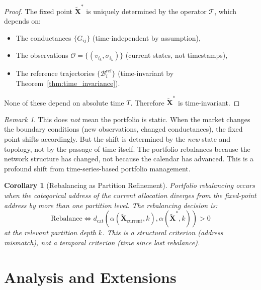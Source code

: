 \documentclass[twocolumn,10pt]{article}
\newtheorem{corollary}[theorem]{Corollary}
\theoremstyle{remark}
\newtheorem{remark}[theorem]{Remark}
\newcommand{\fuzzy}[1]{\tilde{#1}}
\newcommand{\dcat}{d_{\mathrm{cat}}}
\newcommand{\Tcomp}{\mathcal{T}}
\newcommand{\thmref}[1]{Theorem~\ref{#1}}
\begin{document}
\begin{proof}
The fixed point $\fuzzy{\mathbf{X}}^*$ is uniquely determined by the operator $\Tcomp$, which depends on:
\begin{itemize}
    \item The conductances $\{G_{ij}\}$ (time-independent by assumption),
    \item The observations $\mathcal{O} = \{(v_{i_k}, \sigma_{i_k})\}$ (current states, not timestamps),
    \item The reference trajectories $\{\mathcal{B}_i^{\text{ref}}\}$ (time-invariant by \thmref{thm:time_invariance}).
\end{itemize}
None of these depend on absolute time $T$.  Therefore $\fuzzy{\mathbf{X}}^*$ is time-invariant.
\end{proof}

\begin{remark}
This does \emph{not} mean the portfolio is static.  When the market changes the boundary conditions (new observations, changed conductances), the fixed point shifts accordingly.  But the shift is determined by the \emph{new} state and topology, not by the passage of time itself.  The portfolio rebalances because the network structure has changed, not because the calendar has advanced.  This is a profound shift from time-series-based portfolio management.
\end{remark}

\begin{corollary}[Rebalancing as Partition Refinement]
\label{cor:rebalancing}
Portfolio rebalancing occurs when the categorical address of the current allocation diverges from the fixed-point address by more than one partition level.  The rebalancing decision is:
\begin{equation}
    \text{Rebalance} \iff \dcat(\alpha(\fuzzy{\mathbf{X}}_{\text{current}}, k), \alpha(\fuzzy{\mathbf{X}}^*, k)) > 0
    \label{eq:rebalance}
\end{equation}
at the relevant partition depth $k$.  This is a structural criterion (address mismatch), not a temporal criterion (time since last rebalance).
\end{corollary}



\part{Analysis and Extensions}
\end{document}
